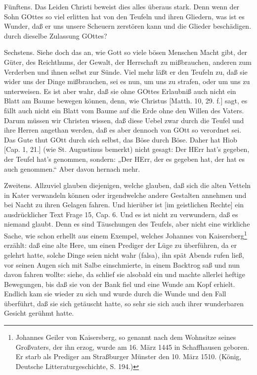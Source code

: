Fünftens. Das Leiden Christi beweist dies alles überaus stark. Denn wenn der Sohn GOttes so viel erlitten hat von den Teufeln und ihren Gliedern, was ist es Wunder, daß er uns unsere Scheuern zerstören kann und die Glieder beschädigen. durch dieselbe Zulassung GOttes?

Sechstens. Siehe doch das an, wie Gott so viele bösen Menschen Macht gibt, der Güter, des Reichthums, der Gewalt, der Herrschaft zu mißbrauchen, anderen zum Verderben und ihnen selbst zur Sünde. Viel mehr läßt er den Teufeln zu, daß sie wider uns der Dinge mißbrauchen, sei es nun, um uns zu strafen, oder um uns zu unterweisen. Es ist aber wahr, daß sie ohne GOttes Erlaubniß auch nicht ein Blatt am Baume bewegen können, denn, wie Christus [Matth. 10, 29. f.] sagt, es fällt auch nicht ein Blatt vom Baume auf die Erde ohne den Willen des Vaters. Darum müssen wir Christen wissen,
daß diese Uebel zwar durch die Teufel und ihre Herren angethan werden, daß es aber dennoch von GOtt so verordnet sei. Das Gute thut GOtt durch sich selbst, das Böse durch Böse. Daher hat Hiob [Cap. 1, 21.] (wie St. Augustinus bemerkt) nicht gesagt: Der HErr hat’s gegeben, der Teufel hat’s genommen, sondern: „Der HErr, der es gegeben hat, der hat es auch genommen.“ Aber davon hernach mehr.

Zweitens. Allzuviel glauben diejenigen, welche glauben, daß sich die alten Vetteln in Kater verwandeln können oder irgendwelche andere Gestalten annehmen und bei Nacht zu ihren Gelagen fahren. Und hierüber ist [im geistlichen Rechte] ein ausdrücklicher Text Frage 15, Cap. 6. Und es ist nicht zu verwundern, daß es niemand glaubt. Denn es sind Täuschungen des Teufels, aber nicht eine wirkliche Sache, wie schon erhellt aus einem Exempel, welches Johannes von Kaisersberg\footnote{Johannes Geiler von Kaisersberg, so genannt nach dem Wohnsitze seines Großvaters, der ihn erzog, wurde am 16. März 1445 in Schaffhausen geboren. Er starb als Prediger am Straßburger Münster den 10. März 1510. (König, Deutsche Litteraturgeschichte, S. 194.)} erzählt: daß eine alte Here, um einen Prediger der Lüge zu überführen, da er gelehrt hatte, solche Dinge seien nicht wahr (falsa), ihn spät Abends rufen ließ, vor seinen Augen sich mit Salbe einschmierte, in einem Backtrog saß und nun davon fahren wollte: siehe, da schlief sie alsobald ein und machte allerlei heftige Bewegungen, bis daß sie von der Bank fiel und eine Wunde am Kopf erhielt. Endlich kam sie wieder zu sich und wurde durch die Wunde und den Fall überführt, daß sie sich getäuscht hatte, so sehr sie sich auch ihrer wunderbaren Gesicht gerühmt hatte.

